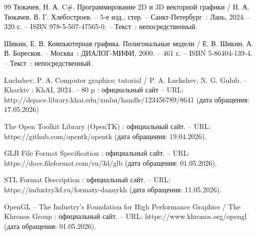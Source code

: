 \begin{thebibliography}{99}
	 Тюкачев, Н. А. C\#. Программирование 2D и 3D векторной графики / Н. А. Тюкачев, В. Г. Хлебостроев. – 5-е изд., стер. – Санкт-Петербург~: Лань, 2024. – 320 с. – ISBN 978-5-507-47565-0. – Текст~: непосредственный.
	
	 Шикин, Е. В. Компьютерная графика. Полигональные модели / Е. В. Шикин, А. В. Боресков. – Москва~: ДИАЛОГ-МИФИ, 2000. – 461 с. – ISBN 5-86404-139-4. – Текст~: непосредственный.
	
	 Luchshev, P. A. Computer graphics: tutorial / P. A. Luchshev, N. G. Gulub. – Kharkiv : KhAI, 2024. – 80 p : официальный сайт – URL: http://dspace.library.khai.edu/xmlui/handle/123456789/8641 (дата обращения: 17.05.2026)
	
	 The Open Toolkit Library (OpenTK) : официальный сайт. – URL: https://github.com/opentk/opentk (дата обращения: 19.04.2026).
	
	 GLB File Format Specification : официальный сайт. – URL: https://docs.fileformat.com/ru/3d/glb (дата обращения: 01.05.2026).
	
	 STL Format Description : официальный сайт. – URL: https://industry3d.ru/formaty-dannykh (дата обращения: 11.05.2026).
	
	 OpenGL – The Industry’s Foundation for High Performance Graphics / The Khronos Group : официальный сайт. – URL: https://www.khronos.org/opengl (дата обращения: 01.05.2026).
\end{thebibliography}
